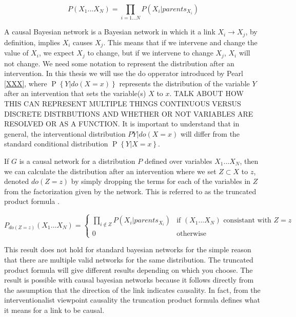 \documentclass[11pt,a4paper,oneside]{book}
\renewcommand{\P}[1]{\operatorname{P}\left\{#1\right\}}
\begin{document}
\begin{equation}
P(X_{1}...X_{N}) = \prod_{i = 1...N}P(X_{i}|parents_{X_{i}})
\end{equation}

A causal Bayesian network is a Bayesian network in which it a link $X_{i} \rightarrow X_{j}$, by definition, implies $X_{i}$ causes $X_{j}$. This means that if we intervene and change the value of $X_{i}$, we expect $X_{j}$ to change, but if we intervene to change $X_{j}$, $X_{i}$ will not change. We need some notation to represent the distribution after an intervention. In this thesis we will use the do opperator introduced by Pearl \ref{XXX}, where $\P{Y|do(X=x)}$ represents the distribution of the variable $Y$ after an intervention that sets the variable(s) $X$ to $x$. TALK ABOUT HOW THIS CAN REPRESENT MULTIPLE THINGS CONTINUOUS VERSUS DISCRETE DISTRBUTIONS AND WHETHER OR NOT VARIABLES ARE RESOLVED OR AS A FUNCTION. It is important to understand that in general, the interventional distribution $P{Y|do(X=x)}$ will differ from the standard conditional distribution $\P{Y|X=x}$.

If $G$ is a causal network for a distribution $P$ defined over variables $X_{1}...X_{N}$, then we can calculate the distribution after an intervention where we set $Z \subset X$ to $z$, denoted $do(Z=z)$ by simply dropping the terms for each of the variables in $Z$ from the factorization given by the network. This is referred to as the truncated product formula \cite{Pearl2000}.

\begin{equation}
\label{eq:truncatedproduct}
 P_{do(Z=z)}(X_{1}...X_{N}) =
  \begin{cases}
  \prod_{i \notin Z}P(X_{i}|parents_{X_{i}}) & \text{if $(X_{1}...X_{N})$ consistant with $Z=z$}  \\
   0       & \text{otherwise } 
  \end{cases}
\end{equation}

This result does not hold for standard bayesian networks for the simple reason that there are multiple valid networks for the same distribution. The truncated product formula will give different results depending on which you choose. The result is possible with causal bayesian networks because it follows directly from the assumption that the direction of the link indicates causality. In fact, from the interventionalist viewpoint causality the truncation product formula defines what it means for a link to be causal. 
\end{document}
